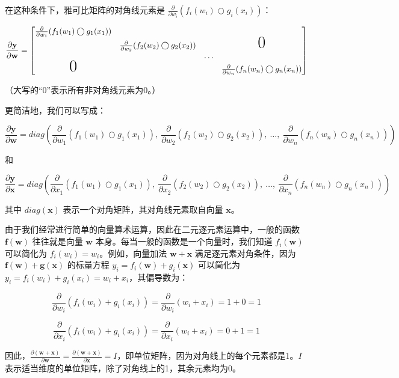 \documentclass[11pt]{article}
\begin{document}
在这种条件下，雅可比矩阵的对角线元素是 $\frac{\partial}{\partial w_i} ( f_i(w_i) \bigcirc g_i(x_i) )$：

\[
\frac{\partial \mathbf{y}}{\partial \mathbf{w}}  = \begin{bmatrix}
\frac{\partial}{\partial w_1} ( f_{1}(w_1) \bigcirc g_{1}(x_1) )\\
& \frac{\partial}{\partial w_2} (f_{2}(w_2) \bigcirc g_{2}(x_2) ) & & \text{\huge0}\\
& & \ldots \\
\text{\huge0}& & & \frac{\partial}{\partial w_n} (f_{n}(w_n) \bigcirc g_{n}(x_n) )
\end{bmatrix}
\]

（大写的“0”表示所有非对角线元素为0。）

更简洁地，我们可以写成：

\[
\frac{\partial \mathbf{y}}{\partial \mathbf{w}} = diag \left( \frac{\partial}{\partial w_1}(f_{1}(w_1) \bigcirc g_{1}(x_1)),~ \frac{\partial}{\partial w_2}(f_{2}(w_2) \bigcirc g_{2}(x_2)),~ \ldots,~ \frac{\partial}{\partial w_n}(f_{n}(w_n) \bigcirc g_{n}(x_n)) \right)
\]

和

\[
\frac{\partial \mathbf{y}}{\partial \mathbf{x}} = diag \left( \frac{\partial}{\partial x_1}(f_{1}(w_1) \bigcirc g_{1}(x_1)),~ \frac{\partial}{\partial x_2}(f_{2}(w_2) \bigcirc g_{2}(x_2)),~ \ldots,~ \frac{\partial}{\partial x_n}(f_{n}(w_n) \bigcirc g_{n}(x_n)) \right)
\]

其中 $diag(\mathbf{x})$ 表示一个对角矩阵，其对角线元素取自向量 $\mathbf{x}$。

由于我们经常进行简单的向量算术运算，因此在二元逐元素运算中，一般的函数 $\mathbf{f(w)}$ 往往就是向量 $\mathbf{w}$ 本身。每当一般的函数是一个向量时，我们知道 $f_i(\mathbf{w})$ 可以简化为 $f_i(w_i) = w_i$。例如，向量加法 $\mathbf{w + x}$ 满足逐元素对角条件，因为 $\mathbf{f(w)} + \mathbf{g(x)}$ 的标量方程 $y_i = f_i(\mathbf{w}) + g_i(\mathbf{x})$ 可以简化为 $y_i = f_i(w_i) + g_i(x_i) = w_i + x_i$，其偏导数为：

\[
\frac{\partial}{\partial w_i} ( f_{i}(w_i) + g_{i}(x_i) ) = \frac{\partial}{\partial w_i}(w_i + x_i) = 1 + 0 = 1
\]

\[
\frac{\partial}{\partial x_i} ( f_{i}(w_i) + g_{i}(x_i) ) = \frac{\partial}{\partial x_i}(w_i + x_i) = 0 + 1 = 1
\]

因此，$\frac{\partial (\mathbf{w+x})}{\partial \mathbf{w}} = \frac{\partial (\mathbf{w+x})}{\partial \mathbf{x}} = I$，即单位矩阵，因为对角线上的每个元素都是1。$I$ 表示适当维度的单位矩阵，除了对角线上的1，其余元素均为0。
\end{document}
